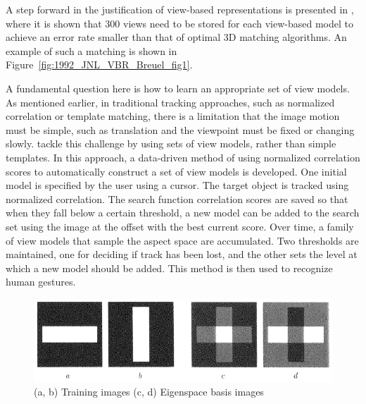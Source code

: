 A step forward in the justification of view-based representations is presented in  \cite{1992_JNL_VBR_Breuel}, where it is shown that 300 views need to be stored for each view-based model to achieve an error rate smaller than that of optimal 3D matching algorithms.  An example of such a matching is shown in Figure~\ref{fig:1992_JNL_VBR_Breuel_fig1}.%

A fundamental question here is how to learn an appropriate set of view models.  As mentioned earlier, in traditional tracking approaches, such as normalized correlation or template matching, there is a limitation that the image motion must be simple, such as translation and the viewpoint must be fixed or changing slowly.  \cite{1993_CNF_Gestures_Darrell} tackle this challenge by using sets of view models, rather than simple templates.  In this approach, a data-driven method of using normalized correlation scores to automatically construct a set of view models is developed.  One initial model is specified by the user using a cursor.  The target object is tracked using normalized correlation.  The search function correlation scores are saved so that when they fall below a certain threshold, a new model can be added to the search set using the image at the offset with the best current score.  Over time, a family of view models that sample the aspect space are accumulated.  Two thresholds are maintained, one for deciding if track has been lost, and the other sets the level at which a new model should be added.  This method is then used to recognize human gestures.

								\begin{figure}[t]
								\center
								\includegraphics[width=1.0\textwidth]{thesis/TrackingPapers_SubspaceTracking_1998_Black_fig2_nocaption.png}
								\caption{(a, b) Training images (c, d) Eigenspace basis images \cite{1998_JNL_Eigentracking_Black}}
								\end{figure}


